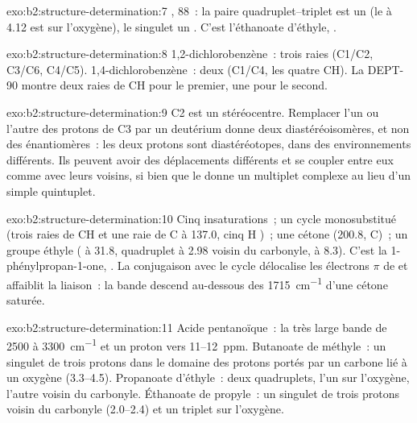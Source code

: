 \begin{solution}{exo:b2:structure-determination:7}
, 88~: la paire quadruplet--triplet est un  (le  à 4.12 est sur l'oxygène),
le singulet un . C'est l'éthanoate d'éthyle, .
\end{solution}

\begin{solution}{exo:b2:structure-determination:8}
1,2-dichlorobenzène~: trois raies (C1/C2, C3/C6, C4/C5). 1,4-dichlorobenzène~: deux (C1/C4, les quatre
CH). La DEPT-90 montre deux raies de CH pour le premier, une pour le second.
\end{solution}

\begin{solution}{exo:b2:structure-determination:9}
C2 est un stéréocentre. Remplacer l'un ou l'autre des protons de C3 par un deutérium donne deux
diastéréoisomères, et non des énantiomères~: les deux protons sont diastéréotopes, dans des
environnements différents. Ils peuvent avoir des déplacements différents et se coupler entre eux comme
avec leurs voisins, si bien que le  donne un multiplet complexe au lieu d'un simple quintuplet.
\end{solution}

\begin{solution}{exo:b2:structure-determination:10}
Cinq insaturations~; un cycle monosubstitué (trois raies de CH et une raie de C à 137.0, cinq H
)~; une cétone (200.8, C)~; un groupe éthyle ( à 31.8, quadruplet à 2.98 voisin du
carbonyle, 
à 8.3). C'est la 1-phénylpropan-1-one, . La conjugaison avec le cycle délocalise les
électrons $\pi$ de  et affaiblit la liaison~: la bande descend au-dessous des \qty{1715}{cm^{-1}}
d'une cétone saturée.
\end{solution}

\begin{solution}{exo:b2:structure-determination:11}
Acide pentanoïque~: la très large bande  de 2500 à \qty{3300}{cm^{-1}} et un proton vers
11--12~ppm. Butanoate de méthyle~: un singulet de trois protons dans le domaine des protons portés par
un carbone lié à un oxygène (3.3--4.5). Propanoate d'éthyle~: deux quadruplets, l'un sur l'oxygène,
l'autre voisin du carbonyle. Éthanoate de propyle~: un singulet de trois protons voisin du carbonyle
(2.0--2.4) et un triplet sur l'oxygène.
\end{solution}

